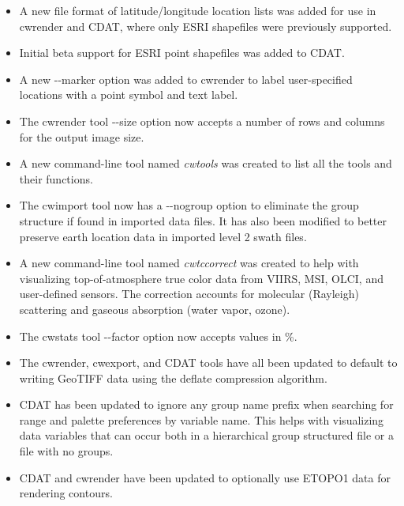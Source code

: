 \begin{itemize}

\item A new file format of latitude/longitude location lists was added 
for use in cwrender and CDAT, where only ESRI shapefiles were previously
supported.

\item Initial beta support for ESRI point shapefiles was added to CDAT.

\item A new -{-}marker option was added to cwrender to label user-specified
locations with a point symbol and text label.

\item The cwrender tool -{-}size option now accepts a number of rows and
columns for the output image size.

\item A new command-line tool named {\em cwtools} was created to list all the 
tools and their functions.

\item The cwimport tool now has a -{-}nogroup option to eliminate the group
structure if found in imported data files.  It has also been modified to better
preserve earth location data in imported level 2 swath files.

\item A new command-line tool named {\em cwtccorrect} was created to help
with visualizing top-of-atmosphere true color data from VIIRS, MSI, OLCI, 
and user-defined sensors. The correction accounts for molecular (Rayleigh) 
scattering and gaseous absorption (water vapor, ozone).

\item The cwstats tool -{-}factor option now accepts values in \%.

\item The cwrender, cwexport, and CDAT tools have all been updated to default
to writing GeoTIFF data using the deflate compression algorithm.

\item CDAT has been updated to ignore any group name prefix when searching for
range and palette preferences by variable name.  This helps with visualizing data 
variables that can occur both in a hierarchical group structured file or a 
file with no groups.

\item CDAT and cwrender have been updated to optionally use ETOPO1 data 
for rendering contours.

\end{itemize}

